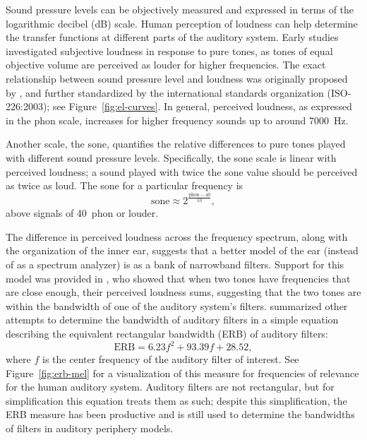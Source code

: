 Sound pressure levels can be objectively measured
and expressed in terms of the logarithmic
decibel (dB) scale.
Human perception of loudness can help
determine the transfer functions
at different parts of the auditory system.
Early studies investigated
subjective loudness in response
to pure tones,
as tones of equal objective volume
are perceived as louder for higher frequencies.
The exact relationship between
sound pressure level and
loudness was originally proposed
by \citet{fletcher1933},
and further standardized
by the international standards organization
(ISO-226:2003);
see Figure~\ref{fig:el-curves}.
In general, perceived loudness,
as expressed in the phon scale,
increases for higher frequency sounds
up to around 7000~Hz.


Another scale, the sone,
quantifies the relative differences
to pure tones played with
different sound pressure levels.
Specifically, the sone scale
is linear with perceived loudness;
a sound played with twice the sone value
should be perceived as twice as loud.
The sone for a particular frequency is
\begin{equation*}
  \text{sone} \approx 2^{\frac{\text{phon} - 40}{10}},
\end{equation*}
above signals of 40~phon or louder.

The difference in perceived loudness
across the frequency spectrum,
along with the organization
of the inner ear,
suggests that a better model
of the ear (instead of as a spectrum analyzer)
is as a bank of narrowband filters.
Support for this model was provided
in \citet{zwicker1957},
who showed that when two tones
have frequencies that are close enough,
their perceived loudness sums,
suggesting that the two tones
are within the bandwidth of one of the
auditory system's filters.
\citet{moore1983}
summarized other attempts to
determine the bandwidth
of auditory filters
in a simple equation
describing the equivalent
rectangular bandwidth (ERB)
of auditory filters:
\begin{equation*}
  \text{ERB} = 6.23 f^2 + 93.39 f + 28.52,
\end{equation*}
where $f$ is the center frequency
of the auditory filter of interest.
See Figure~\ref{fig:erb-mel} for a visualization of
this measure for frequencies of relevance
for the human auditory system.
Auditory filters are not rectangular,
but for simplification this equation
treats them as such;
despite this simplification,
the ERB measure has been productive and is still used
to determine the bandwidths
of filters in auditory periphery models.

